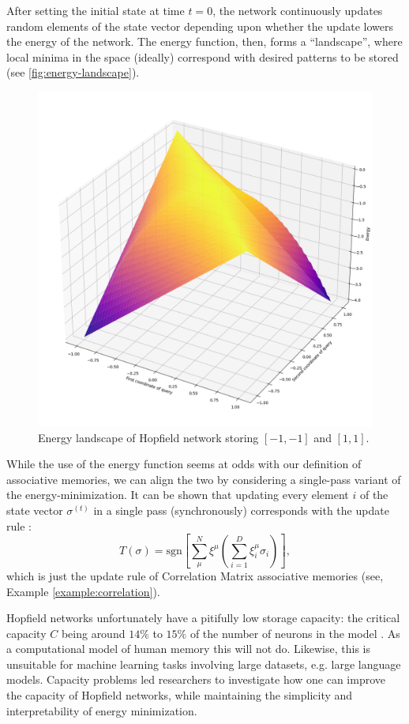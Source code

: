 \documentclass{article}
\theoremstyle{definition}
\begin{document}
After setting the initial state at time $t=0$, the network
continuously updates random
elements of the state vector depending upon whether the update lowers
the energy of the
network. The energy function, then, forms a ``landscape'', where
local minima in the space
(ideally) correspond with desired patterns to be stored (see \autoref{fig:energy-landscape}).

\begin{figure}
    \centering
    \includegraphics[width=0.5\linewidth]{energy_landscape.png}
    \caption{Energy landscape of Hopfield network storing $[-1,-1]$ and $[1,1]$.}
    \label{fig:energy-landscape}
\end{figure}

While the use of the energy function seems at odds with our definition
of associative memories, we can align the two by considering a
single-pass variant of the energy-minimization. It can be shown
that updating every element $i$ of the state vector $\sigma^{(t)}$
in a single pass (synchronously) corresponds with the update rule
\parencite{krotov_modern_2025}:
\begin{equation}\label{eq:hopfield-sync}
  T(\sigma) = \text{sgn} \left[ \sum^N_\mu \xi^\mu \left(
  \sum^D_{i=1} \xi^\mu_i \sigma_i \right) \right],
\end{equation}
which is just the update rule of Correlation Matrix associative memories
(see, Example \ref{example:correlation}).

Hopfield networks unfortunately have a pitifully low
storage capacity: the critical capacity $C$ being around $14\%$ to $15\%$
of the number of neurons in the model
\parencites{amit_statistical_1987,hopfield_neural_1982}. As a computational
model of human memory this will not do.  %
Likewise, this is unsuitable for machine learning tasks involving large
datasets, e.g. large language models. Capacity problems led researchers
to investigate how one can improve the capacity of Hopfield networks,
while maintaining the simplicity and interpretability of energy minimization.
\end{document}

